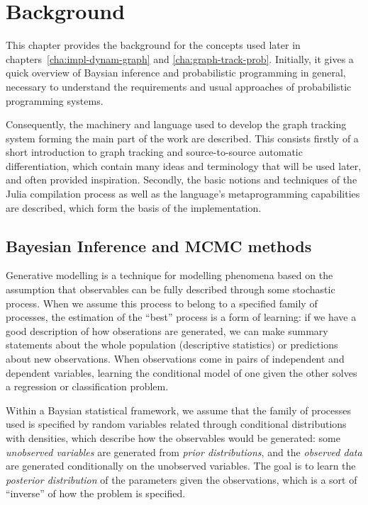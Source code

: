 \chapter{Background}
\label{cha:background}

This chapter provides the background for the concepts used later in
chapters~\ref{cha:impl-dynam-graph} and \ref{cha:graph-track-prob}.  Initially, it gives a quick
overview of Baysian inference and probabilistic programming in general, necessary to understand the
requirements and usual approaches of probabilistic programming systems.

Consequently, the machinery and language used to develop the graph tracking system forming the main
part of the work are described.  This consists firstly of a short introduction to graph tracking and
source-to-source automatic differentiation, which contain many ideas and terminology that will be
used later, and often provided inspiration.  Secondly, the basic notions and techniques of the Julia
compilation process as well as the language's metaprogramming capabilities are described, which form
the basis of the implementation.


\section{Bayesian Inference and MCMC methods}
\label{sec:bayes-infer}

Generative modelling is a technique for modelling phenomena based on the assumption that
observables can be fully described through some stochastic process.  When we assume this process to
belong to a specified family of processes, the estimation of the \enquote{best} process is a form of
learning: if we have a good description of how obserations are generated, we can make summary
statements about the whole population (descriptive statistics) or predictions about new
observations.  When observations come in pairs of independent and dependent variables, learning the
conditional model of one given the other solves a regression or classification problem.

Within a Baysian statistical framework, we assume that the family of processes used is specified by
random variables related through conditional distributions with densities, which describe how the
observables would be generated: some \emph{unobserved variables} are generated from \emph{prior
  distributions}, and the \emph{observed data} are generated conditionally on the unobserved
variables.  The goal is to learn the \emph{posterior distribution} of the parameters given the
observations, which is a sort of \enquote{inverse} of how the problem is specified.

